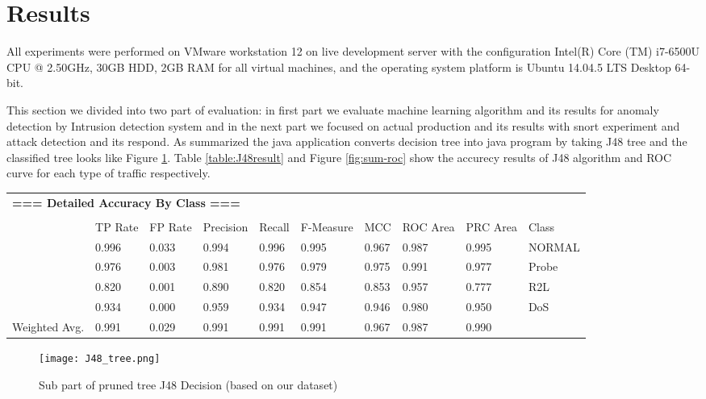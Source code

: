 \section{Results}
\label{results}

All experiments were performed on VMware workstation 12 on live development server with the configuration Intel(R) Core (TM) i7-6500U CPU @ 2.50GHz, 30GB HDD, 2GB RAM for all virtual machines, and the operating system platform is Ubuntu 14.04.5 LTS Desktop 64-bit.

This section we divided into two part of evaluation: in first part we evaluate machine learning algorithm and its results for anomaly detection by Intrusion detection system and in the next part we focused on actual production and its results with snort experiment and attack detection and its respond. As summarized the java application converts decision tree into java program by taking J48 tree and the classified tree looks like Figure \ref{fig:J48tree}. Table \ref{table:J48result} and Figure \ref{fig:sum-roc} show the accurecy results of J48 algorithm and ROC curve for each type of traffic respectively.

\begin{table*}
\begin{center}
\begin{tabular}[width=\textwidth]{llllllllll}
\multicolumn{10}{l}{\bfseries === Detailed Accuracy By Class ===}\\
\\
 & TP Rate & FP Rate & Precision & Recall & F-Measure & MCC & ROC Area & PRC Area & Class\\
 & 0.996 & 0.033 & 0.994 & 0.996 & 0.995 & 0.967 & 0.987 & 0.995 & NORMAL\\
 & 0.976 & 0.003 & 0.981 & 0.976 & 0.979 & 0.975 & 0.991 & 0.977 & Probe\\
 & 0.820 & 0.001 & 0.890 & 0.820 & 0.854 & 0.853 & 0.957 & 0.777 & R2L\\
 & 0.934 & 0.000 & 0.959 & 0.934 & 0.947 & 0.946 & 0.980 & 0.950 & DoS\\
 Weighted Avg. & 0.991 & 0.029 & 0.991 & 0.991 & 0.991 & 0.967 & 0.987 & 0.990 & \\
\end{tabular}
\end{center}
\caption{Accuracy Result of J48 algorithm (based on our dataset)}
\label{table:J48result}
\end{table*}

\begin{figure}[h!]
	\centering
	\texttt{[image: J48\_tree.png]}
	\caption{Sub part of pruned tree J48 Decision (based on our dataset)}
	\label{fig:J48tree}
\end{figure}

